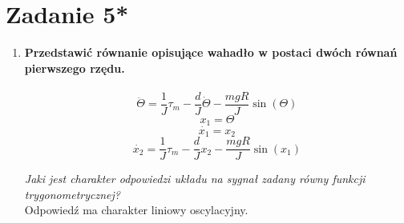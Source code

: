 \documentclass[12pt, letterpaper]{article}
\begin{document}
    \section*{Zadanie 5*}
    \begin{enumerate}
        
        \item \textbf{Przedstawić równanie opisujące wahadło w postaci dwóch
        równań pierwszego rzędu.}\\\\
        \[\ddot{\Theta}=\frac{1}{J}\tau_m
        -\frac{d}{J}\dot{\Theta}
        -\frac{mgR}{J}\sin(\Theta)\]
        \[x_1=\Theta\]
        \[\dot{x_1}=x_2\]
        \[\dot{x_2}=\frac{1}{J}\tau_m
        -\frac{d}{J}x_2
        -\frac{mgR}{J}\sin(x_1)\]


            \emph{Jaki jest charakter odpowiedzi układu na sygnał zadany równy funkcji trygonometrycznej?}\\
            Odpowiedź ma charakter liniowy oscylacyjny.
            
    \end{enumerate}
\end{document}
